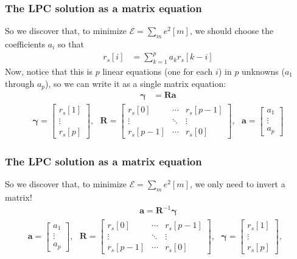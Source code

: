 \documentclass{beamer}
\begin{document}
\begin{frame}
  \frametitle{The LPC solution as a matrix equation}

  So we discover that, to minimize $\mathcal{E}=\sum_me^2[m]$, we
  should choose the coefficients $a_i$ so that
  \begin{align*}
    r_s[i] &= \sum_{k=1}^p a_kr_s[k-i]
  \end{align*}
  Now, notice that this is $p$ linear equations (one for each $i$) in
  $p$ unknowns ($a_1$ through $a_p$), so we can write it as a single
  matrix equation:
  \begin{align*}
    \boldsymbol{\gamma} &= \mathbf{R}\mathbf{a}
  \end{align*}
  \begin{align*}
    \boldsymbol{\gamma}=\left[\begin{array}{c}r_s[1]\\\vdots\\r_s[p]\end{array}\right],~~~
    \mathbf{R}=\left[\begin{array}{ccc}r_s[0]&\cdots&r_s[p-1]\\
        \vdots&\ddots&\vdots\\r_s[p-1]&\cdots&r_s[0]\end{array}\right],~~~
    \mathbf{a}=\left[\begin{array}{c}a_1\\\vdots\\a_p\end{array}\right]
  \end{align*}
\end{frame}
    
\begin{frame}
  \frametitle{The LPC solution as a matrix equation}

  So we discover that, to minimize $\mathcal{E}=\sum_me^2[m]$, we
  only need to invert a matrix!
  \begin{align*}
    \mathbf{a}=\mathbf{R}^{-1}\boldsymbol{\gamma}
  \end{align*}
  \begin{align*}
    \mathbf{a}=\left[\begin{array}{c}a_1\\\vdots\\a_p\end{array}\right],~~~
    \mathbf{R}=\left[\begin{array}{ccc}r_s[0]&\cdots&r_s[p-1]\\
        \vdots&\ddots&\vdots\\r_s[p-1]&\cdots&r_s[0]\end{array}\right],~~~
    \boldsymbol{\gamma}=\left[\begin{array}{c}r_s[1]\\\vdots\\r_s[p]\end{array}\right],~~~
  \end{align*}
\end{frame}
    
\end{document}
